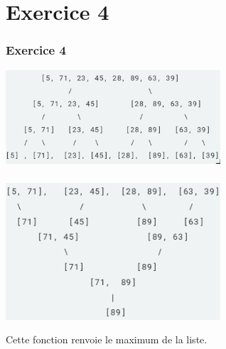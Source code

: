 \documentclass[svgnames,11pt]{beamer}
\begin{document}
\section{Exercice 4}
\begin{frame}
    \frametitle{Exercice 4}
\begin{center}
\centering
\includegraphics[width=8cm]{ressources/separation.png}
\label{IMG}
\end{center}
\end{frame}
\begin{frame}
    \frametitle{}

    \begin{center}
        \centering
        \includegraphics[width=8cm]{ressources/combinaison.png}
        \label{IMG}
        \end{center}
        Cette fonction renvoie le maximum de la liste.
\end{frame}
\end{document}

